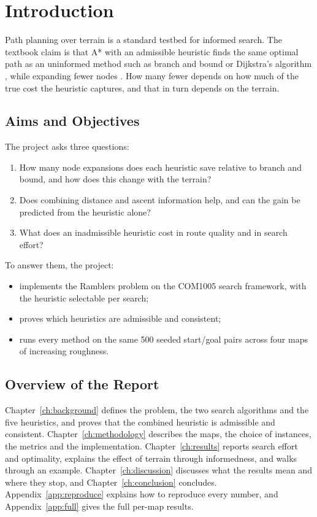 \chapter{Introduction}

Path planning over terrain is a standard testbed for informed search. The textbook claim is that A* with an admissible heuristic finds the same optimal path as an uninformed method such as branch and bound or Dijkstra's algorithm \citep{dijkstra1959note,lawler1966branch}, while expanding fewer nodes \citep{hart1968formal,dechter1985generalized}. How many fewer depends on how much of the true cost the heuristic captures, and that in turn depends on the terrain.


\section{Aims and Objectives}

The project asks three questions:
\begin{enumerate}
  \item How many node expansions does each heuristic save relative to branch and bound, and how does this change with the terrain?
  \item Does combining distance and ascent information help, and can the gain be predicted from the heuristic alone?
  \item What does an inadmissible heuristic cost in route quality and in search effort?
\end{enumerate}

To answer them, the project:
\begin{itemize}
  \item implements the Ramblers problem on the COM1005 search framework, with the heuristic selectable per search;
  \item proves which heuristics are admissible and consistent;
  \item runs every method on the same 500 seeded start/goal pairs across four maps of increasing roughness.
\end{itemize}


\section{Overview of the Report}

Chapter~\ref{ch:background} defines the problem, the two search algorithms and the five heuristics, and proves that the combined heuristic is admissible and consistent. Chapter~\ref{ch:methodology} describes the maps, the choice of instances, the metrics and the implementation. Chapter~\ref{ch:results} reports search effort and optimality, explains the effect of terrain through informedness, and walks through an example. Chapter~\ref{ch:discussion} discusses what the results mean and where they stop, and Chapter~\ref{ch:conclusion} concludes. Appendix~\ref{app:reproduce} explains how to reproduce every number, and Appendix~\ref{app:full} gives the full per-map results.
